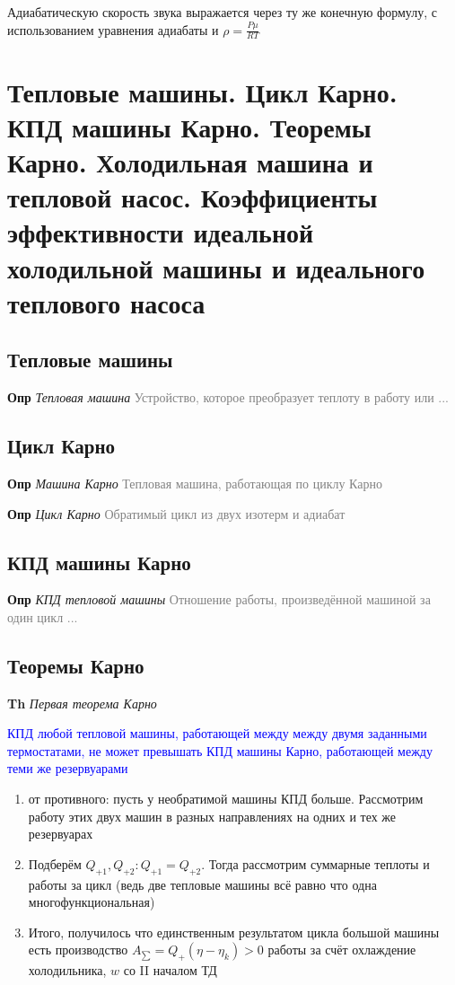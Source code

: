 \documentclass[a4paper, 14pt]{article}
\begin{document}
    Адиабатическую скорость звука выражается через ту же конечную формулу, с использованием уравнения адиабаты и
    $\rho = \frac{P \mu}{RT}$

    \section{Тепловые машины.
    Цикл Карно.
    КПД машины Карно.
    Теоремы Карно.
    Холодильная машина и тепловой насос.
    Коэффициенты эффективности идеальной холодильной машины и идеального теплового насоса}

    \subsection{Тепловые машины}

    \textbf{Опр} \textit{Тепловая машина} \textcolor{gray}{Устройство, которое преобразует теплоту в работу или ...}

    \subsection{Цикл Карно}

    \textbf{Опр} \textit{Машина Карно} \textcolor{gray}{Тепловая машина, работающая по циклу Карно}

    \textbf{Опр} \textit{Цикл Карно} \textcolor{gray}{Обратимый цикл из двух изотерм и адиабат}

    \subsection{КПД машины Карно}

    \textbf{Опр} \textit{КПД тепловой машины} \textcolor{gray}{Отношение работы, произведённой машиной за один цикл ...}

    \subsection{Теоремы Карно}

    \textbf{Th} \textit{Первая теорема Карно}

    \textcolor{blue}{КПД любой тепловой машины, работающей между между двумя заданными термостатами, не может
    превышать КПД машины Карно, работающей между теми же резервуарами}

    \begin{enumerate}
        \item от противного: пусть у необратимой машины КПД больше.
        Рассмотрим работу этих двух машин в разных направлениях на одних и тех же резервуарах
        \item Подберём $Q_{+1}, Q_{+2}: Q_{+1} = Q_{+2}$.
        Тогда рассмотрим суммарные теплоты и работы за цикл (ведь две тепловые машины всё равно что одна
        многофункциональная)
        \item Итого, получилось что единственным результатом цикла большой машины есть производство $A_{\sum} = Q_+
        (\eta - \eta_k) > 0$ работы за счёт охлаждение холодильника, $w$ со II началом ТД
    \end{enumerate}
\end{document}
